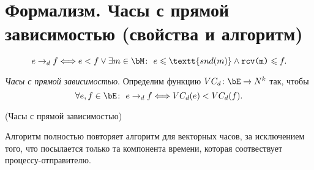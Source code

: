 \section{Формализм. Часы с прямой зависимостью (свойства и алгоритм)}

\begin{definition}
    \[
        e \to_d f \Llra e < f \vee \exists m \in \bM \colon~ e \leqslant \textt{snd(m)}
        \wedge \texttt{rcv(m)} \leqslant f
    .\]
\end{definition}

\begin{definition}
    \textit{Часы с прямой зависимостью}. Определим функцию $VC_d \colon \bE \to N^k$
    так, чтобы
    \[
        \forall e, f \in \bE\colon~ e \to_d f \Llra VC_d(e) < VC_d(f)
    .\]
\end{definition}

\begin{algorithm}(Часы с прямой зависимостью)

    Алгоритм полностью повторяет алгоритм для векторных часов, за исключением
    того, что посылается только та компонента времени, которая соотвествует
    процессу-отправителю.
\end{algorithm}
